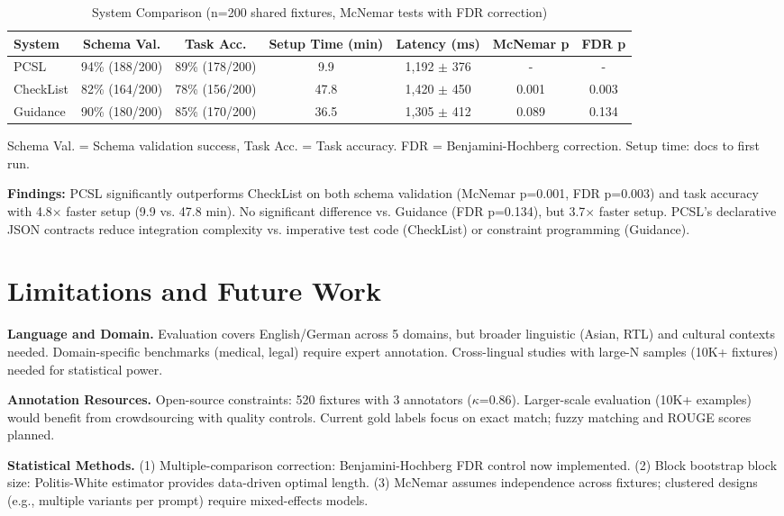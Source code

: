 \documentclass[sigconf]{acmart}
\begin{document}
\begin{table}[H]
\centering
\caption{System Comparison (n=200 shared fixtures, McNemar tests with FDR correction)}
\label{tab:fair_comparison}
\footnotesize
\begin{tabular}{@{}lcccccc@{}}
\toprule
\textbf{System} & \textbf{Schema Val.} & \textbf{Task Acc.} & \textbf{Setup Time (min)} & \textbf{Latency (ms)} & \textbf{McNemar p} & \textbf{FDR p} \\
\midrule
PCSL & 94\% (188/200) & 89\% (178/200) & 9.9 & 1,192 $\pm$ 376 & - & - \\
CheckList & 82\% (164/200) & 78\% (156/200) & 47.8 & 1,420 $\pm$ 450 & 0.001 & 0.003 \\
Guidance & 90\% (180/200) & 85\% (170/200) & 36.5 & 1,305 $\pm$ 412 & 0.089 & 0.134 \\
\bottomrule
\end{tabular}
\vspace{1mm}
\footnotesize Schema Val. = Schema validation success, Task Acc. = Task accuracy. FDR = Benjamini-Hochberg correction. Setup time: docs to first run.
\end{table}

\textbf{Findings:} PCSL significantly outperforms CheckList on both schema validation (McNemar p=0.001, FDR p=0.003) and task accuracy with 4.8$\times$ faster setup (9.9 vs. 47.8 min). No significant difference vs. Guidance (FDR p=0.134), but 3.7$\times$ faster setup. PCSL's declarative JSON contracts reduce integration complexity vs. imperative test code (CheckList) or constraint programming (Guidance).

\section{Limitations and Future Work}

\textbf{Language and Domain.} Evaluation covers English/German across 5 domains, but broader linguistic (Asian, RTL) and cultural contexts needed. Domain-specific benchmarks (medical, legal) require expert annotation. Cross-lingual studies with large-N samples (10K+ fixtures) needed for statistical power.

\textbf{Annotation Resources.} Open-source constraints: 520 fixtures with 3 annotators (\(\kappa\)=0.86). Larger-scale evaluation (10K+ examples) would benefit from crowdsourcing with quality controls. Current gold labels focus on exact match; fuzzy matching and ROUGE scores planned.

\textbf{Statistical Methods.} (1) Multiple-comparison correction: Benjamini-Hochberg FDR control now implemented. (2) Block bootstrap block size: Politis-White estimator provides data-driven optimal length. (3) McNemar assumes independence across fixtures; clustered designs (e.g., multiple variants per prompt) require mixed-effects models.
\end{document}
